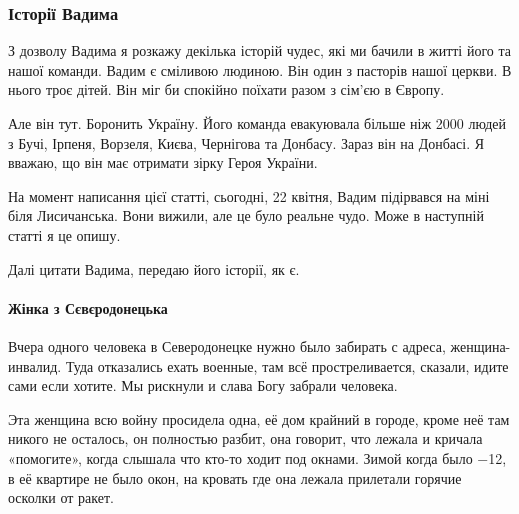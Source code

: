  
 
 
 
 

\subsubsection{Історії Вадима}
\label{sec:25_04_2022.stz.pc.ua.dou.1.geroizm_pogljad_kapellana.5.istorii_vadyma}

З дозволу Вадима я розкажу декілька історій чудес, які ми бачили в житті його
та нашої команди. Вадим є сміливою людиною. Він один з пасторів нашої церкви. В
нього троє дітей. Він міг би спокійно поїхати разом з сім'єю в Європу.

Але він тут. Боронить Україну. Його команда евакуювала більше ніж 2000 людей з
Бучі, Ірпеня, Ворзеля, Києва, Чернігова та Донбасу. Зараз він на Донбасі. Я
вважаю, що він має отримати зірку Героя України.


На момент написання цієї статті, сьогодні, 22 квітня, Вадим підірвався на міні
біля Лисичанська. Вони вижили, але це було реальне чудо. Може в наступній
статті я це опишу.

Далі цитати Вадима, передаю його історії, як є.

\paragraph{Жінка з Сєвєродонецька}

Вчера одного человека в Северодонецке нужно было забирать с адреса,
женщина-инвалид. Туда отказались ехать военные, там всё простреливается,
сказали, идите сами если хотите. Мы рискнули и слава Богу забрали человека.

Эта женщина всю войну просидела одна, её дом крайний в городе, кроме неё там
никого не осталось, он полностью разбит, она говорит, что лежала и кричала
«помогите», когда слышала что кто-то ходит под окнами. Зимой когда было −12, в
её квартире не было окон, на кровать где она лежала прилетали горячие осколки
от ракет.


